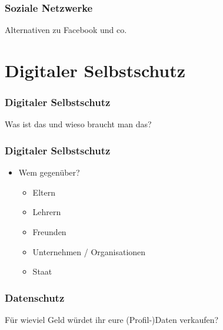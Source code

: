 \documentclass[12pt]{beamer}
\begin{document}
\begin{frame}
  \frametitle{Soziale Netzwerke}

  \begin{center} \Large
   Alternativen zu Facebook und co. 
  \end{center}
\end{frame}

\section{Digitaler Selbstschutz}

\begin{frame}
  \frametitle{Digitaler Selbstschutz}

  \begin{center} \Large
   Was ist das und wieso braucht man das? 
  \end{center}
\end{frame}

\begin{frame}
  \frametitle{Digitaler Selbstschutz}

  \begin{itemize}
    \item Wem gegenüber?
      \begin{itemize}
        \item<2-> Eltern
        \item<3-> Lehrern
        \item<4-> Freunden
        \item<5-> Unternehmen / Organisationen
        \item<6-> Staat
      \end{itemize}
  \end{itemize}
\end{frame}

\begin{frame}
  \frametitle{Datenschutz}

  \begin{center} \Large
   Für wieviel Geld würdet ihr eure (Profil-)Daten verkaufen?
  \end{center}
\end{frame}
\end{document}
